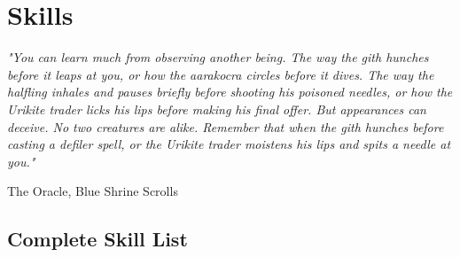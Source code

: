 \chapter{Skills}\label{chap:skills}

\epigraph{\textit{
    "You can learn much from observing another being. The way the gith hunches before it leaps at you, or how the aarakocra
    circles before it dives. The way the halfling inhales and pauses briefly before shooting his poisoned needles, or how the
    Urikite trader licks his lips before making his final offer. But appearances can deceive. No two creatures are alike.
    Remember that when the gith hunches before casting a defiler spell, or the Urikite trader moistens his lips and spits a
    needle at you." } } { The Oracle, Blue Shrine Scrolls }

\section{Complete Skill List}

